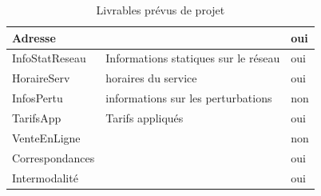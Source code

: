 \documentclass[a4paper]{report}
\begin{document}
\begin{doublespace}
\begin{table}[H]
\begin{center}
\begin{tabularx}{17.5cm}{|p{2.5cm}|X|p{3.5cm}|}
				\hline
				Adresse                                      &                                                     & oui           \\
				\hline
				InfoStatReseau                               & Informations statiques sur le réseau                &
				oui                                                                                                                \\
				\hline
				HoraireServ                                  & horaires du service                                 & oui           \\
				\hline
				InfosPertu                                   & informations sur les perturbations                  & non           \\
				\hline
				TarifsApp                                    & Tarifs appliqués                                    & oui           \\
				\hline
				VenteEnLigne                                 &                                                     & non           \\
				\hline
				Correspondances                              &                                                     & oui           \\
				\hline
				Intermodalité                                &                                                     & oui           \\
				\hline
			\end{tabularx}
			\caption{Livrables prévus de projet}
		\end{center}
	\end{table}


\end{doublespace}
\end{document}
